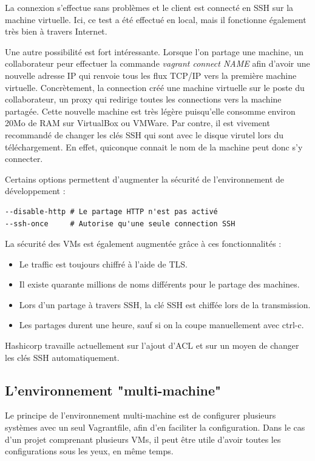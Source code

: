 \documentclass[12pt,a4paper]{article}
\begin{document}
La connexion s'effectue sans problèmes et le client est connecté en SSH sur la machine virtuelle.  Ici, ce test a été effectué en local, mais il fonctionne également très bien à travers Internet.

Une autre possibilité est fort intéressante. Lorsque l'on partage une machine, un collaborateur peur effectuer la commande \textit{vagrant connect NAME} afin d'avoir une nouvelle adresse IP qui renvoie tous les flux TCP/IP vers la première machine virtuelle. Concrètement, la connection créé une machine virtuelle sur le poste du collaborateur, un proxy qui redirige toutes les connections vers la machine partagée. Cette nouvelle machine est très légère puisqu'elle consomme environ 20Mo de RAM sur VirtualBox ou VMWare. Par contre, il est vivement recommandé de changer les clés SSH qui sont avec le disque virutel lors du téléchargement. En effet, quiconque connait le nom de la machine peut donc s'y connecter. 

Certains options permettent d'augmenter la sécurité de l'environnement de développement :
\begin{lstlisting}
--disable-http # Le partage HTTP n'est pas activé
--ssh-once     # Autorise qu'une seule connection SSH
\end{lstlisting}
La sécurité des VMs est également augmentée grâce à ces fonctionnalités :
\begin{itemize}
	\item{Le traffic est toujours chiffré à l'aide de TLS.}
	\item{Il existe quarante millions de noms différents pour le partage des machines.}
	\item{Lors d'un partage à travers SSH, la clé SSH est chiffée lors de la transmission.}
	\item{Les partages durent une heure, sauf si on la coupe manuellement avec ctrl-c.}
\end{itemize}

Hashicorp travaille actuellement sur l'ajout d'ACL et sur un moyen de changer les clés SSH automatiquement.	

\subsection{L'environnement "multi-machine"}
Le principe de l'environnement multi-machine est de configurer plusieurs systèmes avec un seul Vagrantfile, afin d'en faciliter la configuration. Dans le cas d'un projet comprenant plusieurs VMs, il peut être utile d'avoir toutes les configurations sous les yeux, en même temps.
\end{document}
